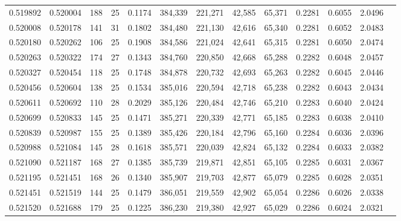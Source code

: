 \begin{tabular}{rrrrrrrrrrrrr}
0.519892 & 0.520004 &   188 &  25 &                                     0.1174 & 384,339 & 221,271 &  42,585 &  65,371 & 0.2281 & 0.6055 & 2.0496 \\
0.520008 & 0.520178 &   141 &  31 &                                     0.1802 & 384,480 & 221,130 &  42,616 &  65,340 & 0.2281 & 0.6052 & 2.0483 \\
0.520180 & 0.520262 &   106 &  25 &                                     0.1908 & 384,586 & 221,024 &  42,641 &  65,315 & 0.2281 & 0.6050 & 2.0474 \\
0.520263 & 0.520322 &   174 &  27 &                                     0.1343 & 384,760 & 220,850 &  42,668 &  65,288 & 0.2282 & 0.6048 & 2.0457 \\
0.520327 & 0.520454 &   118 &  25 &                                     0.1748 & 384,878 & 220,732 &  42,693 &  65,263 & 0.2282 & 0.6045 & 2.0446 \\
0.520456 & 0.520604 &   138 &  25 &                                     0.1534 & 385,016 & 220,594 &  42,718 &  65,238 & 0.2282 & 0.6043 & 2.0434 \\
0.520611 & 0.520692 &   110 &  28 &                                     0.2029 & 385,126 & 220,484 &  42,746 &  65,210 & 0.2283 & 0.6040 & 2.0424 \\
0.520699 & 0.520833 &   145 &  25 &                                     0.1471 & 385,271 & 220,339 &  42,771 &  65,185 & 0.2283 & 0.6038 & 2.0410 \\
0.520839 & 0.520987 &   155 &  25 &                                     0.1389 & 385,426 & 220,184 &  42,796 &  65,160 & 0.2284 & 0.6036 & 2.0396 \\
0.520988 & 0.521084 &   145 &  28 &                                     0.1618 & 385,571 & 220,039 &  42,824 &  65,132 & 0.2284 & 0.6033 & 2.0382 \\
0.521090 & 0.521187 &   168 &  27 &                                     0.1385 & 385,739 & 219,871 &  42,851 &  65,105 & 0.2285 & 0.6031 & 2.0367 \\
0.521195 & 0.521451 &   168 &  26 &                                     0.1340 & 385,907 & 219,703 &  42,877 &  65,079 & 0.2285 & 0.6028 & 2.0351 \\
0.521451 & 0.521519 &   144 &  25 &                                     0.1479 & 386,051 & 219,559 &  42,902 &  65,054 & 0.2286 & 0.6026 & 2.0338 \\
0.521520 & 0.521688 &   179 &  25 &                                     0.1225 & 386,230 & 219,380 &  42,927 &  65,029 & 0.2286 & 0.6024 & 2.0321 \\

\end{tabular}
